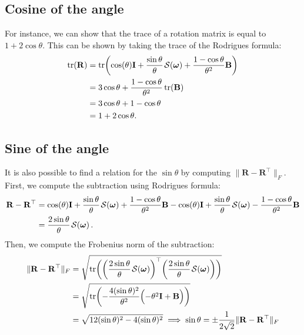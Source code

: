 \subsection{Cosine of the angle}
For instance, we can show that the trace of a rotation matrix is equal to $1+2\cos\theta$. This can be shown by taking the trace of the Rodrigues formula:
\begin{align}
    \tr(\mathbf{R}) &= \tr\biggl(\cos(\theta)\mathbf{I} + \frac{\sin\theta}{\theta}\SL[\boldsymbol{\omega}] + \frac{1-\cos\theta}{\theta^2}\mathbf{B}\biggr)\\
    &= 3\cos\theta + \frac{1-\cos\theta}{\theta^2}\tr(\mathbf{B})\\
    &= 3\cos\theta + 1-\cos\theta\\
    &= 1+2\cos\theta.
\end{align}

\subsection{Sine of the angle}
It is also possible to find a relation for the $\sin\theta$ by computing $\|\mathbf{R} - \mathbf{R}^\top\|_F$. First, we compute the subtraction using Rodrigues formula:
\begin{align}
        \mathbf{R} - \mathbf{R}^\top &= \cos(\theta)\mathbf{I} + \frac{\sin\theta}{\theta}\SL[\boldsymbol{\omega}] + \frac{1-\cos\theta}{\theta^2}\mathbf{B} - \cos(\theta)\mathbf{I} + \frac{\sin\theta}{\theta}\SL[\boldsymbol{\omega}] - \frac{1-\cos\theta}{\theta^2}\mathbf{B}\nonumber\\
        &= \frac{2\sin\theta}{\theta}\SL[\boldsymbol{\omega}].
\end{align}
Then, we compute the Frobenius norm of the subtraction:
\begin{align}
    \|\mathbf{R} - \mathbf{R}^\top\|_F &= \sqrt{\tr\biggl(\biggl(\frac{2\sin\theta}{\theta}\SL[\boldsymbol{\omega}]\biggr)^\top\biggl(\frac{2\sin\theta}{\theta}\SL[\boldsymbol{\omega}]\biggr)\biggr)}\\
    &= \sqrt{\tr\biggl(-\frac{4(\sin\theta)^2}{\theta^2}\Bigl( -\theta^2\mathbf{I} + \mathbf{B}\Bigr)\biggr)}\\
    &=\sqrt{ 12(\sin\theta)^2 - 4(\sin\theta)^2}
    \implies \sin\theta = \pm\frac{1}{2\sqrt{2}}\|\mathbf{R} - \mathbf{R}^\top\|_F
\end{align}

